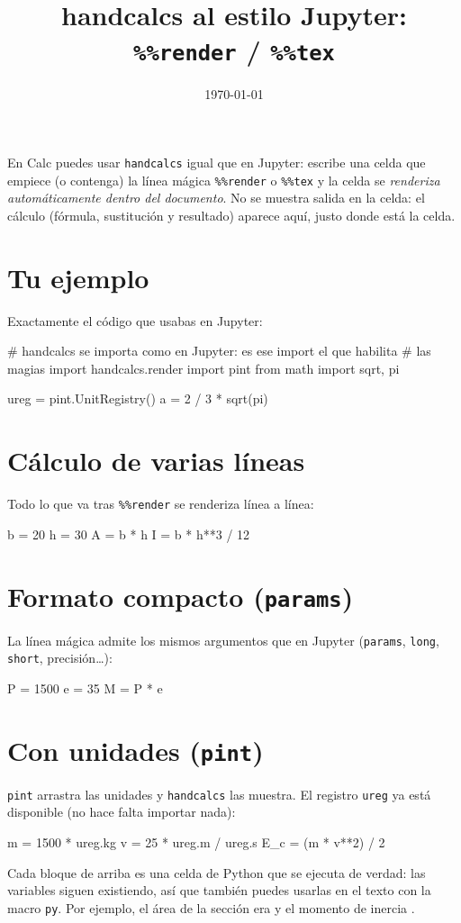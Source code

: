 \documentclass[11pt]{article}
\title{handcalcs al estilo Jupyter: \texttt{\%\%render} / \texttt{\%\%tex}}
\author{}
\date{\today}
\begin{document}
\maketitle

En Calc puedes usar \texttt{handcalcs} igual que en Jupyter: escribe una celda
que empiece (o contenga) la línea mágica \verb|%%render| o \verb|%%tex| y la
celda se \emph{renderiza automáticamente dentro del documento}. No se muestra
salida en la celda: el cálculo (fórmula, sustitución y resultado) aparece aquí,
justo donde está la celda.

\section{Tu ejemplo}
Exactamente el código que usabas en Jupyter:

# handcalcs se importa como en Jupyter: es ese import el que habilita
# las magias %
import handcalcs.render
import pint
from math import sqrt, pi

ureg = pint.UnitRegistry()
a = 2 / 3 * sqrt(pi)

\section{Cálculo de varias líneas}
Todo lo que va tras \verb|%%render| se renderiza línea a línea:

b = 20
h = 30
A = b * h
I = b * h**3 / 12

\section{Formato compacto (\texttt{params})}
La línea mágica admite los mismos argumentos que en Jupyter
(\verb|params|, \verb|long|, \verb|short|, precisión…):

P = 1500
e = 35
M = P * e

\section{Con unidades (\texttt{pint})}
\texttt{pint} arrastra las unidades y \texttt{handcalcs} las muestra. El
registro \texttt{ureg} ya está disponible (no hace falta importar nada):

m = 1500 * ureg.kg
v = 25 * ureg.m / ureg.s
E_c = (m * v**2) / 2

\medskip
Cada bloque de arriba es una celda de Python que se ejecuta de verdad: las
variables siguen existiendo, así que también puedes usarlas en el texto con la
macro \verb|py|. Por ejemplo, el área de la sección era  y el momento
de inercia .
\end{document}
